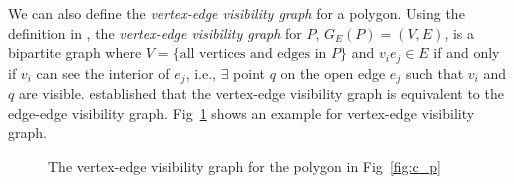 \documentclass[letterpaper, 10 pt, conference]{ieeeconf}  %
\begin{document}
We can also define the \textit{vertex-edge visibility graph} for a polygon. Using the definition in \cite{rourke_viz}, the \textit{vertex-edge visibility graph} for $P$, $G_E(P) = (V, E)$, is a bipartite graph where $V = \{\text{all vertices and edges in $P$}\}$ and $v_ie_j\in E$ if and only if $v_i$ can see the interior of $e_j$, i.e., $\exists$ point $q$ on the open edge $e_j$ such that $v_i$ and $q$ are visible. \cite{rourke_viz} established that the vertex-edge visibility graph is equivalent to the edge-edge visibility graph. Fig~\ref{fig:veg} shows an example for vertex-edge visibility graph.
\begin{figure}
\centering
{}
\caption{The vertex-edge visibility graph for the polygon in Fig~\ref{fig:c_p}}\label{fig:veg}

\end{figure}
\end{document}

